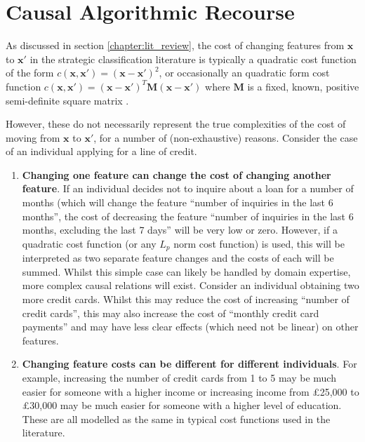 \chapter{Causal Algorithmic Recourse} \label{chapter:causal_recourse}

As discussed in section \ref{chapter:lit_review}, the cost of changing features from $\mathbf{x}$ to $\mathbf{x}'$ in the strategic classification literature is typically a quadratic cost function of the form $c(\mathbf{x}, \mathbf{x}') = (\mathbf{x} - \mathbf{x}')^2$, or occasionally an quadratic form cost function $c(\mathbf{x}, \mathbf{x}') = (\mathbf{x-x'})^T\mathbf{M}(\mathbf{x-x'})$ where $\mathbf{M}$ is a fixed, known, positive semi-definite square matrix \citep{bechavodInformationDiscrepancyStrategic2022}.

However, these do not necessarily represent the true complexities of the cost of moving from $\mathbf{x}$ to $\mathbf{x}'$, for a number of (non-exhaustive) reasons. Consider the case of an individual applying for a line of credit.

\begin{enumerate}
	\item \textbf{Changing one feature can change the cost of changing another feature}. If an individual decides not to inquire about a loan for a number of months (which will change the feature ``number of inquiries in the last 6 months'', the cost of decreasing the feature ``number of inquiries in the last 6 months, excluding the last 7 days'' will be very low or zero. However, if a quadratic cost function (or any $L_p$ norm cost function) is used, this will be interpreted as two separate feature changes and the costs of each will be summed. Whilst this simple case can likely be handled by domain expertise, more complex causal relations will exist. Consider an individual obtaining two more credit cards. Whilst this may reduce the cost of increasing ``number of credit cards'', this may also increase the cost of ``monthly credit card payments'' and may have less clear effects (which need not be linear) on other features.
	
	\item \textbf{Changing feature costs can be different for different individuals}. For example, increasing the number of credit cards from 1 to 5 may be much easier for someone with a higher income or increasing income from £25,000 to £30,000 may be much easier for someone with a higher level of education. These are all modelled as the same in typical cost functions used in the literature. 
\end{enumerate}

